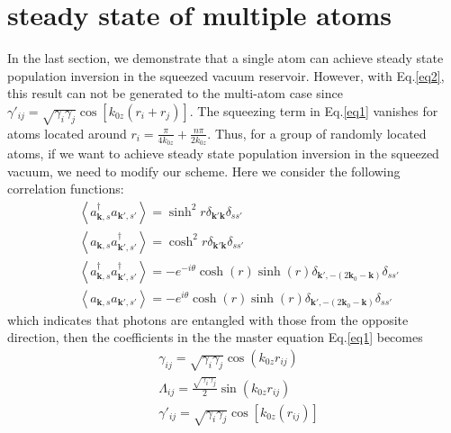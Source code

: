 \documentclass[aps,showpacs,twocolumn,twoside,groupedaddress]{revtex4}
\let\vec\bm
\begin{document}

\section{steady state of multiple atoms}
In the last section, we demonstrate that a single atom can achieve steady state population inversion in the squeezed vacuum reservoir. However, with Eq.\eqref{eq2}, this result can not be generated to the multi-atom case since $\gamma'_{ij}=\sqrt{\gamma_{i}\gamma_{j}}\cos[k_{0z}(r_{i}+r_{j})]$. The squeezing term in Eq.\eqref{eq1} vanishes for atoms located around $r_i=\frac{\pi}{4k_{0z}}+\frac{n\pi}{2k_{0z}}$. Thus, for a group of randomly located atoms, if we want to achieve steady state population inversion in the squeezed vacuum, we need to modify our scheme. Here we consider the following correlation functions:
\begin{equation}
\label{eq0b}
\begin{split}
& \left\langle a_{\vec{k},s}^{\dagger}a_{\vec{k}',s'}\right\rangle =\sinh^{2}r\delta_{\vec{k}'\vec{k}}\delta_{ss'} \\
& \left\langle a_{\vec{k},s}a_{\vec{k}',s'}^{\dagger}\right\rangle =\cosh^{2}r\delta_{\vec{k}'\vec{k}}\delta_{ss'}\\
& \left\langle a_{\vec{k},s}^{\dagger}a_{\vec{k}',s'}^{\dagger}\right\rangle =-e^{-i\theta}\cosh(r)\sinh(r)\delta_{\vec{k}',-(2\vec{k}_{0}-\vec{k})}\delta_{ss'}\\
&\left\langle a_{\vec{k},s}a_{\vec{k}',s'}\right\rangle =-e^{i\theta}\cosh(r)\sinh(r)\delta_{\vec{k}',-(2\vec{k}_{0}-\vec{k})}\delta_{ss'}
\end{split}
\end{equation}
which indicates that photons are entangled with those from the opposite direction, then the coefficients in the the master equation Eq.\eqref{eq1} becomes 
\begin{equation}
\label{eq2b}
\begin{split}
& \gamma_{ij}=\sqrt{\gamma_{i}\gamma_{j}}\cos(k_{0z}r_{ij}) \\
& \Lambda_{ij}=\frac{\sqrt{\gamma_{i}\gamma_{j}}}{2}\sin(k_{0z}r_{ij})\\
& \gamma'_{ij}=\sqrt{\gamma_{i}\gamma_{j}}\cos[k_{0z}(r_{ij})]
\end{split}
\end{equation}
\end{document}

